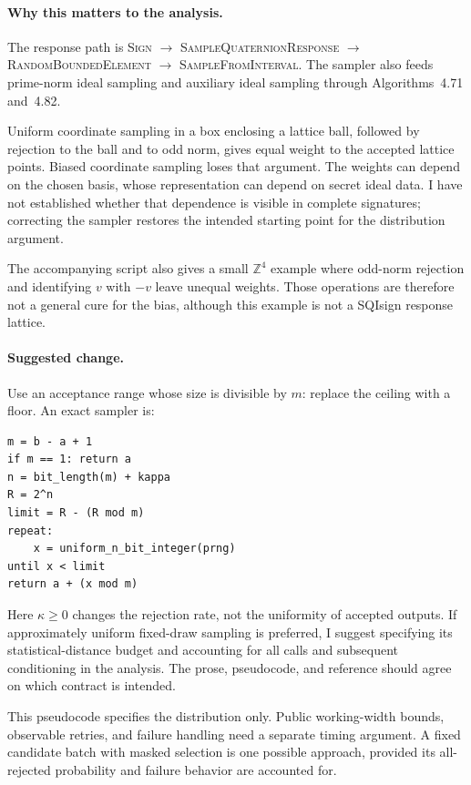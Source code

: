 \documentclass[a4paper,11pt]{article}
\begin{document}
\paragraph{Why this matters to the analysis.}
The response path is \textsc{Sign} $\to$ \textsc{SampleQuaternionResponse}
$\to$ \textsc{RandomBoundedElement} $\to$ \textsc{SampleFromInterval}.
The sampler also feeds prime-norm ideal sampling and auxiliary ideal
sampling through Algorithms~4.71 and~4.82.

Uniform coordinate sampling in a box enclosing a lattice ball, followed by
rejection to the ball and to odd norm, gives equal weight to the accepted
lattice points. Biased coordinate sampling loses that argument. The weights
can depend on the chosen basis, whose representation can depend on secret
ideal data. I have not established whether that dependence is visible in
complete signatures; correcting the sampler restores the intended starting
point for the distribution argument.

The accompanying script also gives a small $\mathbb{Z}^4$ example where
odd-norm rejection and identifying $v$ with $-v$ leave unequal weights.
Those operations are therefore not a general cure for the bias, although
this example is not a SQIsign response lattice.

\paragraph{Suggested change.}
Use an acceptance range whose size is divisible by $m$: replace the
ceiling with a floor. An exact sampler is:

\begin{Verbatim}[fontsize=\small,frame=single,framesep=3mm]
m = b - a + 1
if m == 1: return a
n = bit_length(m) + kappa
R = 2^n
limit = R - (R mod m)
repeat:
    x = uniform_n_bit_integer(prng)
until x < limit
return a + (x mod m)
\end{Verbatim}

Here $\kappa\geq0$ changes the rejection rate, not the uniformity of accepted
outputs. If approximately uniform fixed-draw sampling is preferred, I
suggest specifying its statistical-distance budget and accounting for all
calls and subsequent conditioning in the analysis. The prose, pseudocode,
and reference should agree on which contract is intended.

This pseudocode specifies the distribution only. Public working-width
bounds, observable retries, and failure handling need a separate timing
argument. A fixed candidate batch with masked selection is one possible
approach, provided its all-rejected probability and failure behavior are
accounted for.
\end{document}
